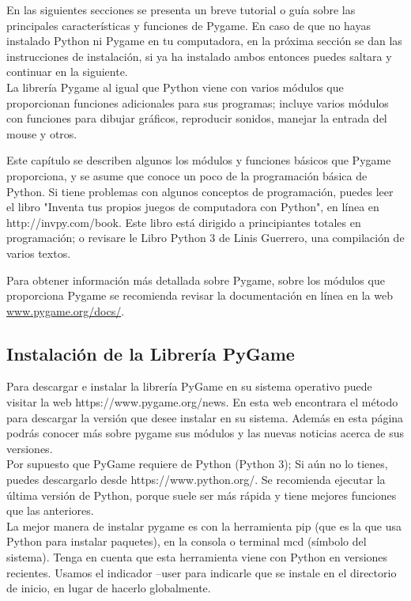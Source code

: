 En las siguientes secciones se presenta un  breve tutorial o guía sobre  las principales características y funciones de Pygame.
En caso de que no hayas instalado Python ni Pygame en tu computadora, en la próxima sección se dan las instrucciones de instalación, si
 ya ha instalado ambos entonces puedes saltara y continuar en la siguiente.\\

La librería  Pygame al igual que Python viene con varios módulos  que proporcionan
funciones adicionales para sus programas; incluye varios módulos con
funciones para dibujar gráficos, reproducir sonidos, manejar la entrada del mouse y otros.

Este capítulo se describen algunos los módulos y funciones básicos que Pygame proporciona, y se asume que conoce un poco de la programación 
básica de Python. Si tiene problemas con algunos conceptos de programación, puedes leer el libro "Inventa tus propios juegos de computadora con Python", en línea en http://invpy.com/book. Este libro está dirigido a principiantes totales en programación; o revisare le Libro Python 3 de Linis Guerrero, una compilación de varios textos.  

Para obtener información más detallada sobre Pygame, sobre los módulos que proporciona Pygame se recomienda revisar 
la documentación en línea en la web \href{www.pygame.org/docs/}{\color{vino}www.pygame.org/docs/}. 



\subsection{Instalación de la Librería PyGame}

Para descargar e instalar la librería PyGame en su sistema operativo puede visitar la web  https://www.pygame.org/news. En esta web encontrara el método para descargar la versión que desee instalar en su sistema. Además en esta página podrás conocer más sobre pygame sus módulos  y las nuevas noticias acerca de sus versiones.\\


Por supuesto que PyGame requiere de Python (Python 3); Si aún no lo tienes, puedes descargarlo desde https://www.python.org/. Se recomienda ejecutar la última versión de Python, porque suele ser más rápida y tiene mejores funciones que las anteriores.\\

La mejor manera de instalar pygame es con la herramienta pip (que es la que usa Python para instalar paquetes), en la consola o terminal mcd (símbolo del sistema). Tenga en cuenta que esta herramienta viene con Python en versiones recientes. Usamos el indicador --user para indicarle que se instale en el directorio de inicio, en lugar de hacerlo globalmente.

